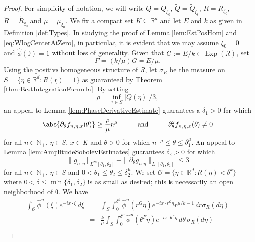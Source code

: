 \documentclass[11pt, letter]{book}
\newcommand\Exp{\operatorname{Exp}}
\newcommand{\p}{\partial}
\begin{document}
\begin{proof}
For simplicity of notation, we will write $Q=Q_{\xi_0}$, $\widetilde{Q}=\widetilde{Q}_{\xi_0}$, $R=R_{\xi_0}$, $\widetilde{R}=\widetilde{R}_{\xi_0}$ and $\mu=\mu_{\xi_0}$. We fix a compact set $K\subseteq\mathbb{R}^d$ and let $E$ and $k$ as given in Definition \ref{def:Types}. In studying the proof of Lemma \ref{lem:EstPosHom} and \eqref{eq:WlogCenterAtZero}, in particular, it is evident that we may assume $\xi_0=0$ and $\widehat{\phi}(0)=1$ without loss of generality. Given that $G:=E/k\in\Exp(R)$, set
\begin{equation*}
    F=(k/\mu)G=E/\mu.
\end{equation*} Using the positive homogeneous structure of $R$, let $\sigma_R$ be the measure on $S=\{\eta\in \mathbb{R}^d:R(\eta)=1\}$ as guaranteed by Theorem \ref{thm:BestIntegrationFormula}. By setting
\begin{equation*}
    \rho=\inf_{\eta\in S}|Q(\eta)|/3,
\end{equation*}
an appeal to Lemma \ref{lem:PhaseDerivativeEstimate} guarantees a $\delta_1>0$ for which 
\begin{equation}\label{eq:EstImagHom1}
    \abs{\partial_{\theta}f_{n,\eta,x}(\theta)}\geq \frac{\rho}{\mu}n^{\mu}\hspace{1cm}\mbox{and}\hspace{1cm}\partial_\theta^2 f_{n,\eta,x}(\theta)\neq 0
\end{equation} for all $n\in\mathbb{N}_+$, $\eta\in S$, $x\in K$ and $\theta>0$ for which $n^{-\mu}\leq \theta\leq \delta_1^\mu$. An appeal to Lemma \ref{lem:AmplitudeSobolevEstimates} guarantees $\delta_2>0$ for which
\begin{equation}\label{eq:EstImagHom2}
    \|g_{n,\eta}\|_{L^\infty[\theta_1,\theta_2]}
    +
    \|\p_\theta g_{n,\eta} \|_{ L^1[\theta_1,\theta_2]}
    \leq 3
\end{equation}
for all $n\in\mathbb{N}_+$, $\eta\in S$ and $0<\theta_1\leq\theta_2\leq\delta_2^{\mu}$. We set $\mathcal{O}=\{\eta\in\mathbb{R}^d:R(\eta)<\delta^k\}$
where $0<\delta\leq \min\{\delta_1,\delta_2\}$ is as small as desired; this is necessarily an open neighborhood of $0$. We have
\begin{eqnarray*}
    \int_{\mathcal{O}}\widehat{\phi}^n(\xi)e^{-ix\cdot\xi}\,d\xi
    &=&
    \int_S\int_0^{\delta^{k}}\widehat{\phi}^n(r^G\eta)e^{-ix\cdot r^G\eta}r^{\mu/k-1}\,dr \sigma_R(d\eta)\\
    &=&
    \frac{k}{\mu}\int_S \int_0^{\delta^{\mu}} \widehat{\phi}^n(\theta^{F} \eta) e^{-i x\cdot\theta^F \eta}  \,d\theta \,\sigma_R(d\eta)\\

\end{eqnarray*}
\end{proof}
\end{document}
